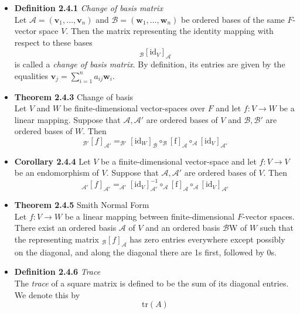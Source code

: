 \documentclass[11pt,a4paper]{article}
\begin{document}
\begin{itemize}

    \item \textbf{Definition 2.4.1} \emph{Change of basis matrix} \\
        Let $\mathcal{A} = (\textbf{v}_1, \ldots, \textbf{v}_n)$ and $\mathcal{B} =
        (\textbf{w}_1, \ldots, \textbf{w}_n)$
        be ordered bases of the same $F$-vector space $V$.
        Then the matrix representing the identity mapping with respect to these bases
        \[
            _\mathcal{B}{[\mathrm{id}_V]}_\mathcal{A}
        \]
        is called a \emph{change of basis matrix}.
        By definition, its entries are given by the equalities $\textbf{v}_j =
        \sum_{i=1}^n a_{ij}\textbf{w}_i$.

    \item \textbf{Theorem 2.4.3} Change of basis \\
        Let $V$ and $W$ be finite-dimensional vector-spaces over $F$ and let $f : V \to W$
        be a linear mapping.
        Suppose that $\mathcal{A, A'}$ are ordered bases of $V$ and $\mathcal{B, B'}$
        are ordered bases of $W$.
        Then
        \[
            _\mathcal{B'}{[f]}_\mathcal{A'} = _\mathcal{B'}{[\mathrm{id}_W]}_\mathcal{B} \circ
            _\mathcal{B}{[\mathrm{f}]}_\mathcal{A} \circ _\mathcal{A}{[\mathrm{id}_V]}_\mathcal{A'}
        \]

    \item \textbf{Corollary 2.4.4}
        Let $V$ be a finite-dimensional vector-space and let
        $f : V \to V$ be an endomorphism of $V$.
        Suppose that $\mathcal{A, A'}$ are ordered bases of $V$.
        Then
        \[
            _\mathcal{A'}{[f]}_\mathcal{A'} = _\mathcal{A'}{[\mathrm{id}_V]}^{-1}_\mathcal{A'}
            \circ _\mathcal{A}{[\mathrm{f}]}_\mathcal{A} \circ _\mathcal{A}
            {[\mathrm{id}_V]}_\mathcal{A'}
        \]

    \item \textbf{Theorem 2.4.5} Smith Normal Form \\
        Let $f : V \to W$ be a linear mapping between finite-dimensional $F$-vector spaces.
        There exist an ordered basis $\mathcal{A}$ of $V$ and an ordered basis
        $\mathcal{B}$W of $W$
        such that the representing matrix $_\mathcal{B}{[f]}_\mathcal{A}$
        has zero entries everywhere except possibly on the diagonal,
        and along the diagonal there are 1s first, followed by 0s.

    \item \textbf{Definition 2.4.6} \emph{Trace} \\
        The \emph{trace} of a square matrix is defined to be the sum of its diagonal entries.
        We denote this by
        \[
            \mathrm{tr}(A)
        \]

\end{itemize}
\end{document}
